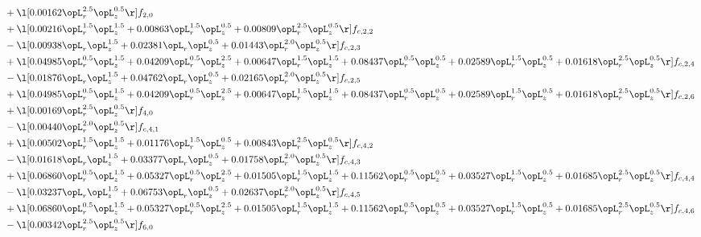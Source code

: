 \begin{alignat}{2}
& + \l[  0.00162 \opL_r^{2.5} \opL_z^{0.5}  \r] f_{2,0} \nonumber \\ 
& + \l[  0.00216 \opL_r^{1.5} \opL_z^{1.5} +  0.00863 \opL_r^{1.5} \opL_z^{0.5} +  0.00809 \opL_r^{2.5} \opL_z^{0.5}  \r] f_{c,2,2} \nonumber \\ 
& - \l[  0.00938 \opL_r \opL_z^{1.5} +  0.02381 \opL_r \opL_z^{0.5} +  0.01443 \opL_r^{2.0} \opL_z^{0.5}  \r] f_{c,2,3} \nonumber \\ 
& + \l[  0.04985 \opL_r^{0.5} \opL_z^{1.5} +  0.04209 \opL_r^{0.5} \opL_z^{2.5} +  0.00647 \opL_r^{1.5} \opL_z^{1.5} +  0.08437 \opL_r^{0.5} \opL_z^{0.5} +  0.02589 \opL_r^{1.5} \opL_z^{0.5} +  0.01618 \opL_r^{2.5} \opL_z^{0.5}  \r] f_{c,2,4} \nonumber \\ 
& - \l[  0.01876 \opL_r \opL_z^{1.5} +  0.04762 \opL_r \opL_z^{0.5} +  0.02165 \opL_r^{2.0} \opL_z^{0.5}  \r] f_{c,2,5} \nonumber \\ 
& + \l[  0.04985 \opL_r^{0.5} \opL_z^{1.5} +  0.04209 \opL_r^{0.5} \opL_z^{2.5} +  0.00647 \opL_r^{1.5} \opL_z^{1.5} +  0.08437 \opL_r^{0.5} \opL_z^{0.5} +  0.02589 \opL_r^{1.5} \opL_z^{0.5} +  0.01618 \opL_r^{2.5} \opL_z^{0.5}  \r] f_{c,2,6} \nonumber \\ 
& + \l[  0.00169 \opL_r^{2.5} \opL_z^{0.5}  \r] f_{4,0} \nonumber \\ 
& - \l[  0.00440 \opL_r^{2.0} \opL_z^{0.5}  \r] f_{c,4,1} \nonumber \\ 
& + \l[  0.00502 \opL_r^{1.5} \opL_z^{1.5} +  0.01176 \opL_r^{1.5} \opL_z^{0.5} +  0.00843 \opL_r^{2.5} \opL_z^{0.5}  \r] f_{c,4,2} \nonumber \\ 
& - \l[  0.01618 \opL_r \opL_z^{1.5} +  0.03377 \opL_r \opL_z^{0.5} +  0.01758 \opL_r^{2.0} \opL_z^{0.5}  \r] f_{c,4,3} \nonumber \\ 
& + \l[  0.06860 \opL_r^{0.5} \opL_z^{1.5} +  0.05327 \opL_r^{0.5} \opL_z^{2.5} +  0.01505 \opL_r^{1.5} \opL_z^{1.5} +  0.11562 \opL_r^{0.5} \opL_z^{0.5} +  0.03527 \opL_r^{1.5} \opL_z^{0.5} +  0.01685 \opL_r^{2.5} \opL_z^{0.5}  \r] f_{c,4,4} \nonumber \\ 
& - \l[  0.03237 \opL_r \opL_z^{1.5} +  0.06753 \opL_r \opL_z^{0.5} +  0.02637 \opL_r^{2.0} \opL_z^{0.5}  \r] f_{c,4,5} \nonumber \\ 
& + \l[  0.06860 \opL_r^{0.5} \opL_z^{1.5} +  0.05327 \opL_r^{0.5} \opL_z^{2.5} +  0.01505 \opL_r^{1.5} \opL_z^{1.5} +  0.11562 \opL_r^{0.5} \opL_z^{0.5} +  0.03527 \opL_r^{1.5} \opL_z^{0.5} +  0.01685 \opL_r^{2.5} \opL_z^{0.5}  \r] f_{c,4,6} \nonumber \\ 
& - \l[  0.00342 \opL_r^{2.5} \opL_z^{0.5}  \r] f_{6,0} \nonumber \\ 

\end{alignat}
